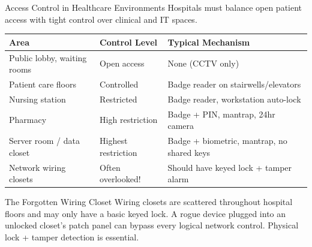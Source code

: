 \documentclass[aspectratio=169]{beamer}  %
\begin{document}
\begin{frame}{Access Control in Healthcare Environments}
    \footnotesize
    Hospitals must balance open patient access with tight control over clinical and IT spaces.

    \vspace{0.3em}
    \begin{table}[]
        \renewcommand{\arraystretch}{1.3}
        \centering
        \small
        \begin{tabular}{|l|l|l|}
        \hline
        \rowcolor[HTML]{EFEFEF} \textbf{Area} & \textbf{Control Level} & \textbf{Typical Mechanism} \\ \hline
        Public lobby, waiting rooms & Open access & None (CCTV only) \\ \hline
        Patient care floors & Controlled & Badge reader on stairwells/elevators \\ \hline
        Nursing station & Restricted & Badge reader, workstation auto-lock \\ \hline
        Pharmacy & High restriction & Badge + PIN, mantrap, 24hr camera \\ \hline
        Server room / data closet & Highest restriction & Badge + biometric, mantrap, no shared keys \\ \hline
        Network wiring closets & Often overlooked! & Should have keyed lock + tamper alarm \\ \hline
        \end{tabular}
    \end{table}

    \begin{alertblock}{The Forgotten Wiring Closet}
        \footnotesize
        Wiring closets are scattered throughout hospital floors and may only have a basic keyed lock. A rogue device plugged into an unlocked closet's patch panel can bypass every logical network control. Physical lock + tamper detection is essential.
    \end{alertblock}
\end{frame}
\end{document}
